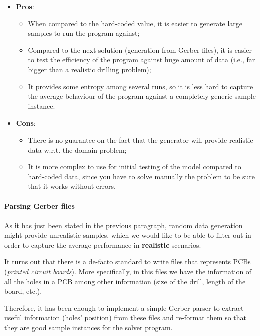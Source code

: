 \begin{itemize}
  \item \textbf{Pros}:
  \begin{itemize}
    \item When compared to the hard-coded value, it is easier to generate large
      samples to run the program against;
    \item Compared to the next solution (generation from Gerber files), it is
      easier to test the efficiency of the program against huge amount of data
      (i.e., far bigger than a realistic drilling problem);
    \item It provides some entropy among several runs, so it is less hard to
      capture the average behaviour of the program against a completely generic
      sample instance.
  \end{itemize}
  \item \textbf{Cons}:
  \begin{itemize}
    \item There is no guarantee on the fact that the generator will provide
      realistic data w.r.t. the domain problem;
    \item It is more complex to use for initial testing of the model compared
      to hard-coded data, since you have to solve manually the problem to be
      sure that it works without errors.
  \end{itemize}
\end{itemize}

\paragraph{Parsing Gerber files} As it has just been stated in the previous
paragraph, random data generation might provide unrealistic samples, which
we would like to be able to filter out in order to capture the average
performance in \textbf{realistic} scenarios.

It turns out that there is a de-facto standard to write files that represents
PCBs (\textit{printed circuit boards}). More specifically, in this files we
have the information of all the holes in a PCB among other information (size
of the drill, length of the board, etc.).

Therefore, it has been enough to implement a simple Gerber parser to extract
useful information (holes' position) from these files and re-format them so
that they are good sample instances for the solver program.

